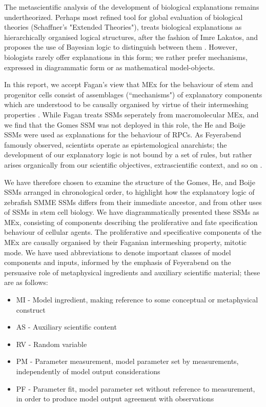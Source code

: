The metascientific analysis of the development of biological explanations remains undertheorized. Perhaps most refined tool for global evaluation of biological theories (Schaffner's "Extended Theories"), treats biological explanations as hierarchically organised logical structures, after the fashion of Imre Lakatos, and proposes the use of Bayesian logic to distinguish between them \cite{Schaffner1993}. However, biologists rarely offer explanations in this form; we rather prefer mechanisms, expressed in diagrammatic form or as mathematical model-objects.

In this report, we accept Fagan's view that MEx for the behaviour of stem and progenitor cells consist of assemblages (``mechanisms") of explanatory components which are understood to be causally organised by virtue of their intermeshing properties \cite{Fagan2015}. While Fagan treats SSMs seperately from macromolecular MEx, and we find that the Gomes SSM was not deployed in this role, the He and Boije SSMs were used as explanations for the behaviour of RPCs. As Feyerabend famously observed, scientists operate as epistemological anarchists; the development of our explanatory logic is not bound by a set of rules, but rather arises organically from our scientific objectives, extrascientific context, and so on \cite{Feyerabend1993}.
 
We have therefore chosen to examine the structure of the Gomes, He, and Boije SSMs arranged in chronological order, to highlight how the explanatory logic of zebrafish SMME SSMs differs from their immediate ancestor, and from other uses of SSMs in stem cell biology. We have diagrammatically presented these SSMs as MEx, consisting of components describing the proliferative and fate specification behaviour of cellular agents. The proliferative and specificative components of the MEx are causally organised by their Faganian intermeshing property, mitotic mode. We have used abbreviations to denote important classes of model components and inputs, informed by the emphasis of Feyerabend on the persuasive role of metaphysical ingredients and auxiliary scientific material; these are as follows:

 \begin{itemize}
	\item{MI - Model ingredient, making reference to some conceptual or metaphysical construct}
	\item{AS - Auxiliary scientific content}
	\item{RV - Random variable}
	\item{PM - Parameter measurement, model parameter set by measurements, independently of model output considerations}
	\item{PF - Parameter fit, model parameter set without reference to measurement, in order to produce model output agreement with observations}
\end{itemize}

